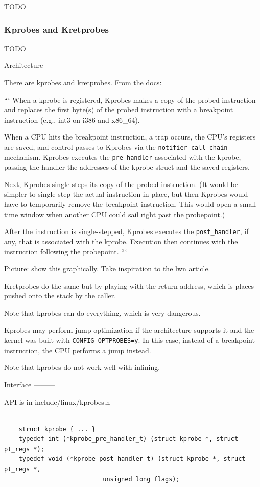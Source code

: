 TODO

\subsubsection*{Kprobes and Kretprobes}

TODO


Architecture
------------

There are kprobes and kretprobes. From the docs:

```
When a kprobe is registered, Kprobes makes a copy of the probed
instruction and replaces the first byte(s) of the probed instruction
with a breakpoint instruction (e.g., int3 on i386 and x86\_64).

When a CPU hits the breakpoint instruction, a trap occurs, the CPU’s
registers are saved, and control passes to Kprobes via the
\verb|notifier_call_chain| mechanism. Kprobes executes the \verb|pre_handler|
associated with the kprobe, passing the handler the addresses of the
kprobe struct and the saved registers.

Next, Kprobes single-steps its copy of the probed instruction. (It
would be simpler to single-step the actual instruction in place, but
then Kprobes would have to temporarily remove the breakpoint
instruction. This would open a small time window when another CPU
could sail right past the probepoint.)

After the instruction is single-stepped, Kprobes executes the
\verb|post_handler|, if any, that is associated with the kprobe. Execution
then continues with the instruction following the probepoint.
```

Picture: show this graphically. Take inspiration to the lwn article.

Kretprobes do the same but by playing with the return address, which
is places pushed onto the stack by the caller.

Note that kprobes can do everything, which is very dangerous.

Kprobes may perform jump optimization if the architecture supports
it and the kernel was built with \verb|CONFIG_OPTPROBES=y|. In this case,
instead of a breakpoint instruction, the CPU performs a jump instead.

Note that kprobes do not work well with inlining.

Interface
---------

API is in include/linux/kprobes.h

\begin{verbatim}

    struct kprobe { ... }
    typedef int (*kprobe_pre_handler_t) (struct kprobe *, struct pt_regs *);
    typedef void (*kprobe_post_handler_t) (struct kprobe *, struct pt_regs *,
		    		       unsigned long flags);

\end{verbatim}

